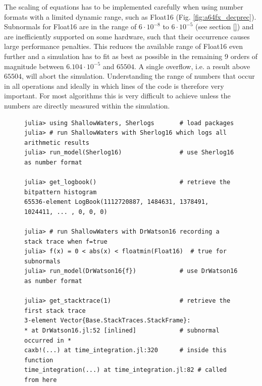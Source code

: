 The scaling of equations has to be implemented carefully when using number formats with a limited dynamic range,
such as Float16 (Fig. \ref{fig:a64fx_decprec}). Subnormals for Float16 are in the range of $6 \cdot 10^{-8}$ to
$6 \cdot 10^{-5}$ (see section \ref{}) and are inefficiently supported on some hardware, such that their occurrence
causes large performance penalties. This reduces the available range of Float16 even further and a simulation
has to fit as best as possible in the remaining 9 orders of magnitude between $6.104 \cdot 10^{-5}$ and $65504$.
A single overflow, i.e. a result above $65504$, will abort the simulation. Understanding the range of numbers
that occur in all operations and ideally in which lines of the code is therefore very important. 
For most algorithms this is very difficult to achieve unless the numbers are directly measured within the simulation. 

\begin{figure}[tbhp]
\begin{lstlisting}[language=JuliaLocal, label=lst:sherlogs, caption={\textbf{Example usage and output of Sherlogs.jl,
a package for Sherlogs and DrWatson, two analysis-number formats that can be combined with type-flexible
functions in Julia.} Using Sherlog16 as the first argument of \texttt{run\_model} runs ShallowWaters.jl with Float16 but
also logs the bitpattern of every arithmetic result into a \emph{logbook} of length $2^{16}=65536$ to create a bitpattern
histogram. \texttt{DrWatson16\{f\}} uses Float16 but also records a stack trace (a list of calling functions and respective
lines of code) every time the function \texttt{f(x)} evaluates to \texttt{true} with the arithmetic result \texttt{x}.
Here, a subnormal arises in a multiplication ($*$ in line 14 here) in line 320 of the code in script \texttt{time\_integration.jl.}}]
julia> using ShallowWaters, Sherlogs       # load packages
julia> # run ShallowWaters with Sherlog16 which logs all arithmetic results
julia> run_model(Sherlog16)                # use Sherlog16 as number format

julia> get_logbook()                       # retrieve the bitpattern histogram
65536-element LogBook(1112720887, 1484631, 1378491, 1024411, ... , 0, 0, 0)

julia> # run ShallowWaters with DrWatson16 recording a stack trace when f=true
julia> f(x) = 0 < abs(x) < floatmin(Float16)  # true for subnormals
julia> run_model(DrWatson16{f})            # use DrWatson16 as number format

julia> get_stacktrace(1)                   # retrieve the first stack trace
3-element Vector{Base.StackTraces.StackFrame}:
* at DrWatson16.jl:52 [inlined]            # subnormal occurred in *
caxb!(...) at time_integration.jl:320      # inside this function
time_integration(...) at time_integration.jl:82 # called from here
\end{lstlisting}
\end{figure}

